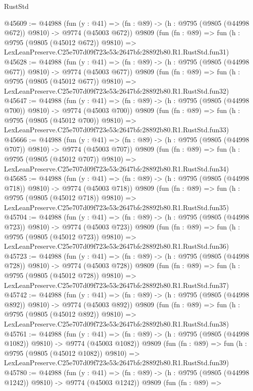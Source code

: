 \begin{lexlean}{RustStd}
\begin{coremodule}
@45609 := @44988
    (fun (y : @41) => (fn : @89) -> (h : @9795 (@9805 (@44998 @672)) @9810) -> @9774 (@45003 @672))
    @9809
    (fun (fn : @89) =>
    fun (h : @9795 (@9805 (@45012 @672)) @9810) =>
    LexLeanPreserve.C25e707d09f723e53c2647bfc28892b80.R1.RustStd.fun31)
@45628 := @44988
    (fun (y : @41) => (fn : @89) -> (h : @9795 (@9805 (@44998 @677)) @9810) -> @9774 (@45003 @677))
    @9809
    (fun (fn : @89) =>
    fun (h : @9795 (@9805 (@45012 @677)) @9810) =>
    LexLeanPreserve.C25e707d09f723e53c2647bfc28892b80.R1.RustStd.fun32)
@45647 := @44988
    (fun (y : @41) => (fn : @89) -> (h : @9795 (@9805 (@44998 @700)) @9810) -> @9774 (@45003 @700))
    @9809
    (fun (fn : @89) =>
    fun (h : @9795 (@9805 (@45012 @700)) @9810) =>
    LexLeanPreserve.C25e707d09f723e53c2647bfc28892b80.R1.RustStd.fun33)
@45666 := @44988
    (fun (y : @41) => (fn : @89) -> (h : @9795 (@9805 (@44998 @707)) @9810) -> @9774 (@45003 @707))
    @9809
    (fun (fn : @89) =>
    fun (h : @9795 (@9805 (@45012 @707)) @9810) =>
    LexLeanPreserve.C25e707d09f723e53c2647bfc28892b80.R1.RustStd.fun34)
@45685 := @44988
    (fun (y : @41) => (fn : @89) -> (h : @9795 (@9805 (@44998 @718)) @9810) -> @9774 (@45003 @718))
    @9809
    (fun (fn : @89) =>
    fun (h : @9795 (@9805 (@45012 @718)) @9810) =>
    LexLeanPreserve.C25e707d09f723e53c2647bfc28892b80.R1.RustStd.fun35)
@45704 := @44988
    (fun (y : @41) => (fn : @89) -> (h : @9795 (@9805 (@44998 @723)) @9810) -> @9774 (@45003 @723))
    @9809
    (fun (fn : @89) =>
    fun (h : @9795 (@9805 (@45012 @723)) @9810) =>
    LexLeanPreserve.C25e707d09f723e53c2647bfc28892b80.R1.RustStd.fun36)
@45723 := @44988
    (fun (y : @41) => (fn : @89) -> (h : @9795 (@9805 (@44998 @728)) @9810) -> @9774 (@45003 @728))
    @9809
    (fun (fn : @89) =>
    fun (h : @9795 (@9805 (@45012 @728)) @9810) =>
    LexLeanPreserve.C25e707d09f723e53c2647bfc28892b80.R1.RustStd.fun37)
@45742 := @44988
    (fun (y : @41) => (fn : @89) -> (h : @9795 (@9805 (@44998 @892)) @9810) -> @9774 (@45003 @892))
    @9809
    (fun (fn : @89) =>
    fun (h : @9795 (@9805 (@45012 @892)) @9810) =>
    LexLeanPreserve.C25e707d09f723e53c2647bfc28892b80.R1.RustStd.fun38)
@45761 := @44988
    (fun (y : @41) =>
    (fn : @89) -> (h : @9795 (@9805 (@44998 @1082)) @9810) -> @9774 (@45003 @1082))
    @9809
    (fun (fn : @89) =>
    fun (h : @9795 (@9805 (@45012 @1082)) @9810) =>
    LexLeanPreserve.C25e707d09f723e53c2647bfc28892b80.R1.RustStd.fun39)
@45780 := @44988
    (fun (y : @41) =>
    (fn : @89) -> (h : @9795 (@9805 (@44998 @1242)) @9810) -> @9774 (@45003 @1242))
    @9809
    (fun (fn : @89) =>

\end{coremodule}
\end{lexlean}
